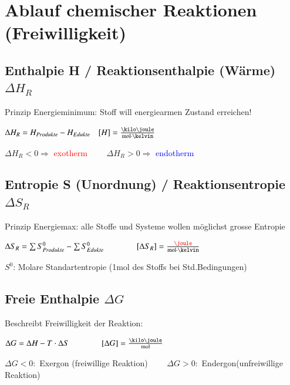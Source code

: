 \section{Ablauf chemischer Reaktionen (Freiwilligkeit)}

\subsection{Enthalpie H / Reaktionsenthalpie (Wärme) $\Delta H_R$}
    Prinzip Energieminimum: Stoff will energiearmen Zustand erreichen!

    $\Delta H_R = H_{Produkte} - H_{Edukte} \quad [H] = \frac{\kilo\joule}{\mol \cdot \kelvin}$

    $\Delta H_R < 0 \Rightarrow$ \textcolor{red}{exotherm} $\qquad \Delta H_R > 0 \Rightarrow$ \textcolor{blue}{endotherm}

\subsection{Entropie S (Unordnung) / Reaktionsentropie $\Delta S_R$}
    Prinzip Energiemax: alle Stoffe und Systeme wollen möglichst grosse Entropie

    $\Delta S_R = \sum S^0_{Produkte} - \sum S^0_{Edukte} \qquad \qquad [\Delta S_R] = \frac{\color{red}\joule}{\mol \cdot \kelvin}$

    $S^0$: Molare Standartentropie (1mol des Stoffs bei Std.Bedingungen)
\subsection{Freie Enthalpie $\Delta G$}
    Beschreibt Freiwilligkeit der Reaktion:

    $\Delta G = \Delta H - T \cdot \Delta S \qquad \qquad [\Delta G] = \frac{\kilo\joule}{\mol}$

    $\Delta G < 0:$ Exergon (freiwillige Reaktion) $\qquad \Delta G > 0:$ Endergon(unfreiwillige Reaktion)


